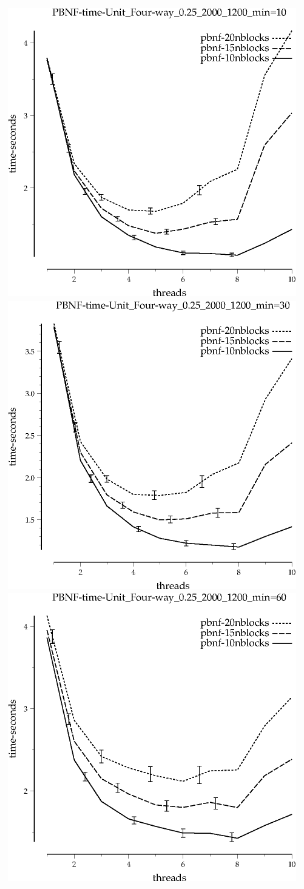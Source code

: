 \documentclass{article}
\begin{document}
\begin{appendices}
\begin{figure}[h]
\begin{center}
\includegraphics[width=3in]{../graphs/grid_unit_four-way_0.25_2000_1200/PBNF-time-Unit_Four-way_0.25_2000_1200_min=10.eps}
\includegraphics[width=3in]{../graphs/grid_unit_four-way_0.25_2000_1200/PBNF-time-Unit_Four-way_0.25_2000_1200_min=30.eps}
\includegraphics[width=3in]{../graphs/grid_unit_four-way_0.25_2000_1200/PBNF-time-Unit_Four-way_0.25_2000_1200_min=60.eps}

\end{center}
\end{figure}
\end{appendices}
\end{document}
